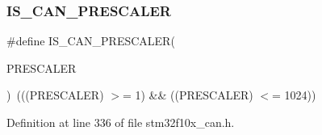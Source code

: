 \subsubsection{\texorpdfstring{I\+S\+\_\+\+C\+A\+N\+\_\+\+P\+R\+E\+S\+C\+A\+L\+ER}{IS\_CAN\_PRESCALER}}
{\footnotesize\ttfamily \#define I\+S\+\_\+\+C\+A\+N\+\_\+\+P\+R\+E\+S\+C\+A\+L\+ER(\begin{DoxyParamCaption}\item[{}]{P\+R\+E\+S\+C\+A\+L\+ER }\end{DoxyParamCaption})~(((P\+R\+E\+S\+C\+A\+L\+ER) $>$= 1) \&\& ((P\+R\+E\+S\+C\+A\+L\+ER) $<$= 1024))}



Definition at line 336 of file stm32f10x\+\_\+can.\+h.

